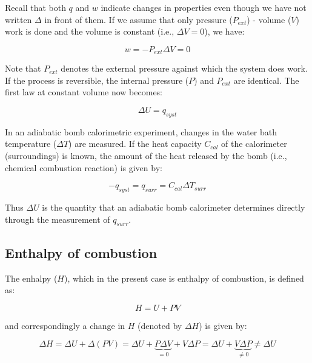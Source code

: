 \documentclass[byrevtex,amssymb,aps,pra,floatfix,letterpaper]{revtex4}
\begin{document}
\noindent
Recall that both $q$ and $w$ indicate changes in properties even though we have not written $\Delta$ in front of them. If we assume that only pressure ($P_{ext}$) - volume ($V$) work is done and the volume is constant (i.e., $\Delta V = 0$), we have:

\begin{equation}
\label{eq2}
w = -P_{ext}\Delta V = 0
\end{equation}

\noindent
Note that $P_{ext}$ denotes the external pressure against which the system does work. If the process is reversible, the internal pressure ($P$) and $P_{ext}$ are identical. The first law at constant volume now becomes:

\begin{equation}
\label{eq3}
\Delta U = q_{syst}
\end{equation}

\noindent
In an adiabatic bomb calorimetric experiment, changes in the water bath temperature ($\Delta T$) are measured. If the heat capacity $C_{cal}$ of the 
calorimeter (surroundings) is known, the amount of the heat released by the bomb (i.e., chemical combustion reaction) is given by:

\begin{equation}
\label{eq4}
-q_{syst} = q_{surr} = C_{cal}\Delta T_{surr}
\end{equation}

\noindent
Thus $\Delta U$ is the quantity that an adiabatic bomb calorimeter determines directly through the measurement of $q_{surr}$.

\subsection{Enthalpy of combustion}

The enhalpy ($H$), which in the present case is enthalpy of combustion, is defined as:

\begin{equation}
\label{eq5}
H = U + PV
\end{equation}

\noindent
and correspondingly a change in $H$ (denoted by $\Delta H$) is given by:

\begin{equation}
\label{eq6}
\Delta H = \Delta U + \Delta (PV) = \Delta U + \underbrace{P\Delta V}_{= 0}
+ V\Delta P = \Delta U + \underbrace{V\Delta P}_{\ne 0} \ne \Delta U
\end{equation}
\end{document}
